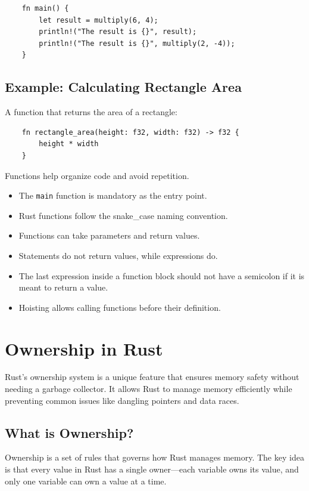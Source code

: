 \documentclass[a4paper,12pt]{report}
\begin{document}
\begin{lstlisting}
	fn main() {
		let result = multiply(6, 4);
		println!("The result is {}", result);
		println!("The result is {}", multiply(2, -4));
	}
\end{lstlisting}

\subsection*{Example: Calculating Rectangle Area}

A function that returns the area of a rectangle:

\begin{lstlisting}
	fn rectangle_area(height: f32, width: f32) -> f32 {
		height * width
	}
\end{lstlisting}


\begin{takeawaybox}
	Functions help organize code and avoid repetition.
	\begin{itemize}
		\item The 	\texttt{main} function is mandatory as the entry point.
		\item Rust functions follow the snake\_case naming convention.
		\item Functions can take parameters and return values.
		\item Statements do not return values, while expressions do.
		\item The last expression inside a function block should not have a semicolon if it is meant to return a value.
		\item Hoisting allows calling functions before their definition.
	\end{itemize}
\end{takeawaybox}



\section{Ownership in Rust}\label{own}

Rust's ownership system is a unique feature that ensures memory safety without needing a garbage collector. It allows Rust to manage memory efficiently while preventing common issues like dangling pointers and data races.

\subsection*{What is Ownership?}
Ownership is a set of rules that governs how Rust manages memory. The key idea is that every value in Rust has a single owner—each variable owns its value, and only one variable can own a value at a time.
\end{document}
